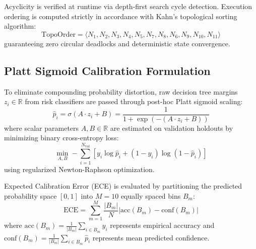 \documentclass[journal]{IEEEtran}
\begin{document}
Acyclicity is verified at runtime via depth-first search cycle detection. Execution ordering is computed strictly in accordance with Kahn's topological sorting algorithm:
\begin{equation}
\text{TopoOrder} = \langle N_1, N_2, N_3, N_4, N_5, N_7, N_8, N_6, N_9, N_{10}, N_{11} \rangle
\end{equation}
guaranteeing zero circular deadlocks and deterministic state convergence.

\subsection{Platt Sigmoid Calibration Formulation}
To eliminate compounding probability distortion, raw decision tree margins $z_i \in \mathbb{R}$ from risk classifiers are passed through post-hoc Platt sigmoid scaling:
\begin{equation}
\hat{p}_i = \sigma(A \cdot z_i + B) = \frac{1}{1 + \exp(-(A \cdot z_i + B))}
\end{equation}
where scalar parameters $A, B \in \mathbb{R}$ are estimated on validation holdouts by minimizing binary cross-entropy loss:
\begin{equation}
\min_{A, B} -\sum_{i=1}^{N_{\text{val}}} \left[ y_i \log \hat{p}_i + (1 - y_i) \log(1 - \hat{p}_i) \right]
\end{equation}
using regularized Newton-Raphson optimization.

Expected Calibration Error (ECE) is evaluated by partitioning the predicted probability space $[0, 1]$ into $M = 10$ equally spaced bins $B_m$:
\begin{equation}
\text{ECE} = \sum_{m=1}^M \frac{|B_m|}{N} \left| \text{acc}(B_m) - \text{conf}(B_m) \right|
\end{equation}
where $\text{acc}(B_m) = \frac{1}{|B_m|} \sum_{i \in B_m} y_i$ represents empirical accuracy and $\text{conf}(B_m) = \frac{1}{|B_m|} \sum_{i \in B_m} \hat{p}_i$ represents mean predicted confidence.
\end{document}
